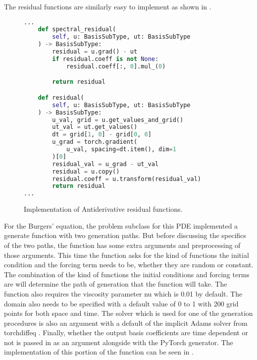The residual functions are similarly easy to implement as shown in .

\begin{figure}[H]
  \centering
  \begin{lstlisting}[language=Python]
...
    def spectral_residual(
        self, u: BasisSubType, ut: BasisSubType
    ) -> BasisSubType:
        residual = u.grad() - ut
        if residual.coeff is not None:
            residual.coeff[:, 0].mul_(0)

        return residual

    def residual(
        self, u: BasisSubType, ut: BasisSubType
    ) -> BasisSubType:
        u_val, grid = u.get_values_and_grid()
        ut_val = ut.get_values()
        dt = grid[1, 0] - grid[0, 0]
        u_grad = torch.gradient(
            u_val, spacing=dt.item(), dim=1
        )[0]
        residual_val = u_grad - ut_val
        residual = u.copy()
        residual.coeff = u.transform(residual_val)
        return residual
...
  \end{lstlisting}
  \caption{Implementation of Antiderivative residual functions.}\label{fig:antiderivative_residual_impl}
\end{figure}

For the Burgers' equation, the problem subclass for this PDE implemented a generate function with two generation paths. But before discussing the specifics of the two paths, the function has some extra arguments and preprocessing of those arguments. This time the function asks for the kind of functions the initial condition and the forcing term needs to be, whether they are random or constant. The combination of the kind of functions the initial conditions and forcing terms are will determine the path of generation that the function will take. The function also requires the viscosity parameter nu which is 0.01 by default. The domain also needs to be specified with a default value of 0 to 1 with 200 grid points for both space and time. The solver which is used for one of the generation procedures is also an argument with a default of the implicit Adams solver from torchdiffeq \autocite{Chen_torchdiffeq_2021}. Finally, whether the output basis coefficients are time dependent or not is passed in as an argument alongside with the PyTorch generator. The implementation of this portion of the function can be seen in .

